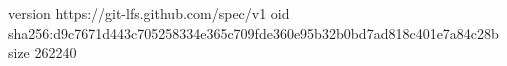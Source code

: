 version https://git-lfs.github.com/spec/v1
oid sha256:d9c7671d443c705258334e365c709fde360e95b32b0bd7ad818c401e7a84c28b
size 262240
